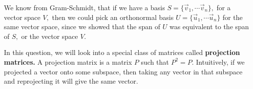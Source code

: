 

We know from Gram-Schmidt, that if we have a basis $S = \{ \vec{v}_{1}, \cdots \vec{v}_{n} \},$ for a vector space $V,$ 
then we could pick an orthonormal basis $U = \{ \vec{u}_{1}, \cdots \vec{u}_{n} \}$ for the same vector space, since we showed that the span of $U$ was equivalent to the span of $S,$ or the vector space $V.$

In this question, we will look into a special class of matrices called \textbf{projection matrices.}
A projection matrix is a matrix $P$ such that $P^{2} = P.$ 
Intuitively, if we projected a vector onto some subspace, then taking any vector in that subspace and reprojecting it will give the same vector.

